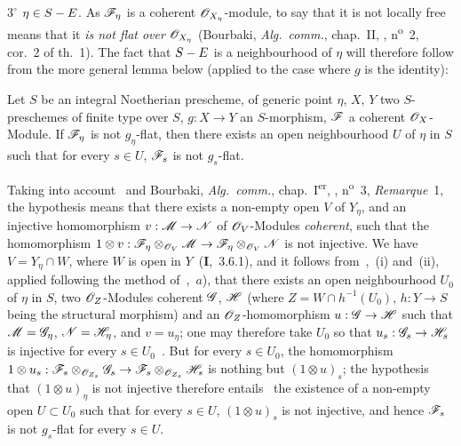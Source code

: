 $3^\circ$ $\eta\in S- E$.
As $\mathscr{F}_\eta$ is a coherent $\mathscr{O}_{X_\eta}$-module, to say that it is not locally free means that it \emph{is not flat over} $\mathscr{O}_{X_\eta}$ (Bourbaki, \emph{Alg.\ comm.}, chap.~II, , n\textsuperscript{o}~2, cor.~2 of th.~1).
The fact that $S- E$ is a neighbourhood of $\eta$ will therefore follow from the more general lemma below (applied to the case where $g$ is the identity):

\begin{lemma}[9.4.7.1]
\label{IV.9.4.7.1}
Let $S$ be an integral Noetherian prescheme, of generic point $\eta$, $X$, $Y$ two $S$-preschemes of finite type over $S$, $g:X\to Y$ an $S$-morphism, $\mathscr{F}$ a coherent $\mathscr{O}_X$-Module.
If $\mathscr{F}_\eta$ is not $g_\eta$-flat, then there exists an open neighbourhood $U$ of $\eta$ in $S$ such that for every $s\in U$, $\mathscr{F}_s$ is not $g_s$-flat.
\end{lemma}

Taking into account~ and Bourbaki, \emph{Alg.\ comm.}, chap.~I\textsuperscript{er}, , n\textsuperscript{o}~3, \emph{Remarque}~1, the hypothesis means that there exists a non-empty open $V$ of $Y_\eta$, and an injective homomorphism $v:\mathscr{M}\to\mathscr{N}$ of $\mathscr{O}_V$-Modules \emph{coherent}, such that the homomorphism $1\otimes v:\mathscr{F}_\eta\otimes_{\mathscr{O}_V}\mathscr{M}\to\mathscr{F}_\eta\otimes_{\mathscr{O}_V}\mathscr{N}$ is not injective.
We have $V=Y_\eta\cap W$, where $W$ is open in $Y$~(\textbf{I},~3.6.1), and it follows from~,~(i) and~(ii), applied following the method of~,~$a$), that there exists an open neighbourhood $U_0$ of $\eta$ in $S$, two $\mathscr{O}_Z$-Modules
coherent $\mathscr{G}$, $\mathscr{H}$ (where $Z=W\cap h^{-1}(U_0)$, $h:Y\to S$ being the structural morphism) and an $\mathscr{O}_Z$-homomorphism $u:\mathscr{G}\to\mathscr{H}$ such that $\mathscr{M}=\mathscr{G}_\eta$, $\mathscr{N}=\mathscr{H}_\eta$, and $v=u_\eta$; one may therefore take $U_0$ so that $u_s:\mathscr{G}_s\to\mathscr{H}_s$ is injective for every $s\in U_0$~.
But for every $s\in U_0$, the homomorphism $1\otimes u_s:\mathscr{F}_s\otimes_{\mathscr{O}_{Z_s}}\mathscr{G}_s\to\mathscr{F}_s\otimes_{\mathscr{O}_{Z_s}}\mathscr{H}_s$ is nothing but $(1\otimes u)_s$; the hypothesis that $(1\otimes u)_\eta$ is not injective therefore entails~ the existence of a non-empty open $U\subset U_0$ such that for every $s\in U$, $(1\otimes u)_s$ is not injective, and hence $\mathscr{F}_s$ is not $g_s$-flat for every $s\in U$.

